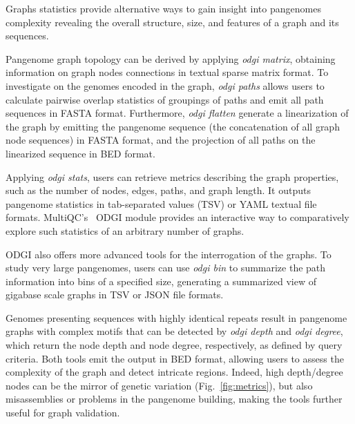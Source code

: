 \documentclass{bioinfo}
\begin{document}
Graphs statistics provide alternative ways to gain insight into pangenomes complexity revealing the overall structure, size, and features of a graph and its sequences.

Pangenome graph topology can be derived by applying \textit{odgi matrix}, obtaining information on graph nodes connections in textual sparse matrix format.
To investigate on the genomes encoded in the graph, \textit{odgi paths} allows users to calculate pairwise overlap statistics of groupings of paths and emit all path sequences in FASTA format.
Furthermore, \textit{odgi flatten} generate a linearization of the graph by emitting the pangenome sequence (the concatenation of all graph node sequences) in FASTA format, and the projection of all paths on the linearized sequence in BED format.

Applying \textit{odgi stats}, users can retrieve metrics describing the graph properties, such as the number of nodes, edges, paths, and graph length.
It outputs pangenome statistics in tab-separated values (TSV) or YAML textual file formats.
MultiQC's~\citep{Ewels_2016} ODGI module %
provides an interactive way to comparatively explore such statistics of an arbitrary number of graphs.

ODGI also offers more advanced tools for the interrogation of the graphs.
To study very large pangenomes, users can use \textit{odgi bin} to summarize the path information into bins of a specified size, generating a summarized view of gigabase scale graphs in TSV or JSON file formats.

Genomes presenting sequences with highly identical repeats result in pangenome graphs with complex motifs that can be detected by \textit{odgi depth} and \textit{odgi degree}, which return the node depth and node degree, respectively, as defined by query criteria.
Both tools emit the output in BED format, allowing users to assess the complexity of the graph and detect intricate regions.
Indeed, high depth/degree nodes can be the mirror of genetic variation (Fig.~\ref{fig:metrics}), but also misassemblies or problems in the pangenome building, making the tools further useful for graph validation.
\end{document}

